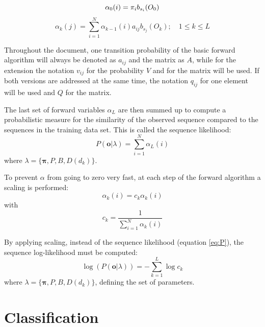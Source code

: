\documentclass[mscthesis]{usiinfthesis}
\begin{document}
\begin{equation}
    \label{eq:forward_init_basic}
    \alpha_0(i) = \pi_{i}b_{s_i}(O_0) \\
\end{equation}
\begin{equation}
    \label{eq:forward_basic}
    \alpha_k(j) = \sum_{i=1}^{N} \alpha_{k-1}(i) a_{ij} b_{s_j}(O_k);
    \quad 1 \leq k \leq L
\end{equation}

Throughout the document, one transition probability of the basic forward
algorithm will always be denoted as $a_{ij}$ and the matrix as $A$, while for
the extension the notation $v_{ij}$ for the probability $V$ and for the matrix
will be used. If both versions are addressed at the same time, the notation
$q_{ij}$ for one element will be used and $Q$ for the matrix.

The last set of forward variables $ \alpha_L $ are then summed up to compute
a probabilistic measure for the similarity of the observed sequence compared to
the sequences in the training data set. This is called the sequence likelihood:
\begin{equation}
    \label{eq:P}
    P(\boldsymbol{o}|\lambda) = \sum\limits_{i=1}^{N} \alpha_L(i)
\end{equation}
where $ \lambda = \{\boldsymbol{\pi}, P, B, D(d_k) \} $.

To prevent $ \alpha $ from going to zero very fast, at each step of the forward
algorithm a scaling is performed:
\begin{equation}
    \label{eq:scaled}
    \alpha_k(i) = c_k \alpha_k(i)
\end{equation}
with
\begin{equation}
    \label{eq:scaling_factor}
    c_k = \frac{1}{\sum\limits_{i=1}^{N} \alpha_k(i)}
\end{equation}

By applying scaling, instead of the sequence likelihood (equation \ref{eq:P}),
the sequence log-likelihood must be computed:
\begin{equation}
    \label{eq:Plog}
    \log(P(\boldsymbol{o}|\lambda)) = -\sum\limits_{k=1}^{L} \log c_k
\end{equation}
where $ \lambda = \{\boldsymbol{\pi}, P, B, D(d_k) \} $, defining the set of
parameters.

\section{Classification}
\label{ch:event_class}
\end{document}

